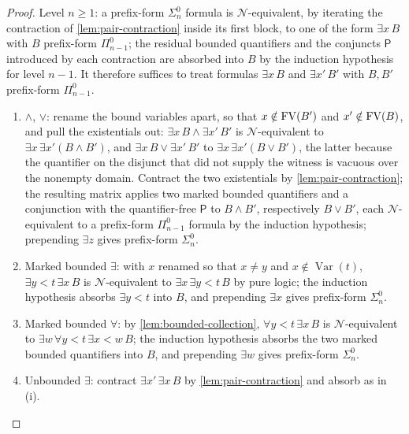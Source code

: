 \begin{proof}
Level \(n\geq1\): a prefix-form \(\Sigma^0_n\) formula is
\(\mathcal N\)-equivalent, by iterating the contraction of
\cref{lem:pair-contraction} inside its first block, to one of the form
\(\exists x\,B\) with \(B\) prefix-form \(\Pi^0_{n-1}\); the residual
bounded quantifiers and the conjuncts \(\mathsf P\) introduced by each
contraction are absorbed into \(B\) by the induction hypothesis for level
\(n-1\).  It therefore suffices to treat formulas \(\exists x\,B\) and
\(\exists x'\,B'\) with \(B,B'\) prefix-form \(\Pi^0_{n-1}\).
\begin{enumerate}[label=(\roman*)]
\item \(\land\), \(\lor\): rename the bound variables apart, so that
      \(x\notin\operatorname{FV}(B')\) and \(x'\notin\operatorname{FV}(B)\), and pull the existentials
      out: \(\exists x\,B\land\exists x'\,B'\) is
      \(\mathcal N\)-equivalent to \(\exists x\,\exists x'(B\land B')\),
      and \(\exists x\,B\lor\exists x'\,B'\) to
      \(\exists x\,\exists x'(B\lor B')\), the latter because the
      quantifier on the disjunct that did not supply the witness is
      vacuous over the nonempty domain.  Contract the two existentials by
      \cref{lem:pair-contraction}; the resulting matrix applies two marked
      bounded quantifiers and a conjunction with the quantifier-free
      \(\mathsf P\) to \(B\land B'\), respectively \(B\lor B'\), each
      \(\mathcal N\)-equivalent to a prefix-form \(\Pi^0_{n-1}\) formula
      by the induction hypothesis; prepending \(\exists z\) gives
      prefix-form \(\Sigma^0_n\).
\item Marked bounded \(\exists\): with \(x\) renamed so that \(x\neq y\)
      and \(x\notin\operatorname{Var}(t)\),
      \(\exists y<t\,\exists x\,B\) is \(\mathcal N\)-equivalent to
      \(\exists x\,\exists y<t\,B\) by pure logic; the induction
      hypothesis absorbs \(\exists y<t\) into \(B\), and prepending
      \(\exists x\) gives prefix-form \(\Sigma^0_n\).
\item Marked bounded \(\forall\): by \cref{lem:bounded-collection},
      \(\forall y<t\,\exists x\,B\) is \(\mathcal N\)-equivalent to
      \(\exists w\,\forall y<t\,\exists x<w\,B\); the induction hypothesis
      absorbs the two marked bounded quantifiers into \(B\), and
      prepending \(\exists w\) gives prefix-form \(\Sigma^0_n\).
\item Unbounded \(\exists\): contract
      \(\exists x'\,\exists x\,B\) by \cref{lem:pair-contraction} and
      absorb as in (i).
\end{enumerate}


\end{proof}
